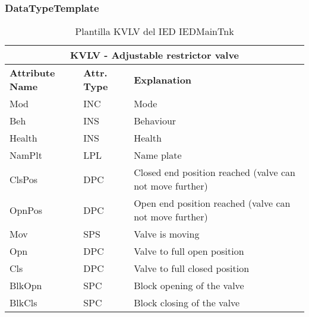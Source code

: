     \subsubsection{DataTypeTemplate}
    \begin{table}[H]
    \begin{center}
    \begin{tabular}{|l|l|p{8.5cm}|}
            \hline
            \multicolumn{3}{|c|}{\cellcolor[gray]{0.8} \textbf{ KVLV}  - Adjustable restrictor valve} \\
            \hline
            \textbf{Attribute Name} & \textbf{Attr. Type} & \textbf{Explanation} \\
            \hline 
            Mod & INC & Mode \\
            \hline
            Beh & INS & Behaviour \\
            \hline
            Health & INS & Health \\
            \hline
            NamPlt & LPL & Name plate \\
            \hline
            ClsPos & DPC & Closed end position reached (valve can not move further) \\
            \hline
            OpnPos & DPC & Open end position reached (valve can not move further) \\
            \hline
            Mov & SPS & Valve is moving \\
            \hline
            Opn & DPC & Valve to full open position \\
            \hline
            Cls & DPC & Valve to full closed position \\
            \hline
            BlkOpn & SPC & Block opening of the valve \\
            \hline
            BlkCls & SPC & Block closing of the valve \\
            \hline
    \end{tabular}
    \caption{Plantilla KVLV del IED IEDMainTnk}
    \label{table:lnTypeKVLV_restrictor}
    \end{center}
    \end{table}
    
    
    